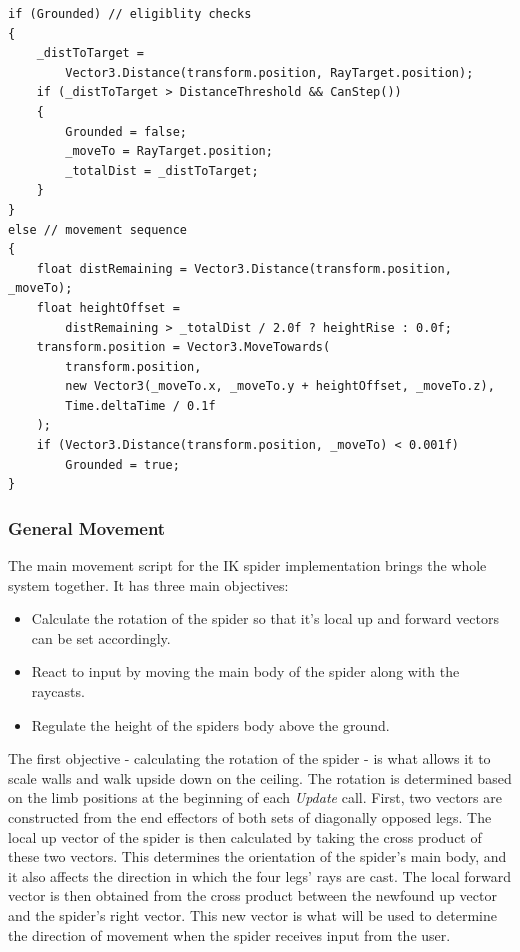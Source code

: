 \begin{lstlisting}[basicstyle=\footnotesize, numbers=none,frame=single,
caption={The script's \textit{Update} method which contains eligibility checks
and execution logic for the leg target's movement sequence.
\textit{TargetLogic.cs}},captionpos=b, label=target_move, language={[Sharp]c},
float=tp]
if (Grounded) // eligiblity checks
{
    _distToTarget = 
        Vector3.Distance(transform.position, RayTarget.position);
    if (_distToTarget > DistanceThreshold && CanStep())
    {
        Grounded = false;
        _moveTo = RayTarget.position;
        _totalDist = _distToTarget;
    }
}
else // movement sequence
{
    float distRemaining = Vector3.Distance(transform.position, _moveTo);
    float heightOffset =
        distRemaining > _totalDist / 2.0f ? heightRise : 0.0f;
    transform.position = Vector3.MoveTowards(
        transform.position,
        new Vector3(_moveTo.x, _moveTo.y + heightOffset, _moveTo.z),
        Time.deltaTime / 0.1f
    );
    if (Vector3.Distance(transform.position, _moveTo) < 0.001f)
        Grounded = true;
}
\end{lstlisting}

\subsubsection{General Movement}
The main movement script for the IK spider implementation brings the whole
system together. It has three main objectives:

\begin{itemize}

    \item Calculate the rotation of the spider so that it's local up and forward
        vectors can be set accordingly.

    \item React to input by moving the main body of the spider along with the
        raycasts.

    \item Regulate the height of the spiders body above the ground.

\end{itemize}

The first objective - calculating the rotation of the spider - is what allows it
to scale walls and walk upside down on the ceiling. The rotation is determined
based on the limb positions at the beginning of each \textit{Update} call.
First, two vectors are constructed from the end effectors of both sets of
diagonally opposed legs. The local up vector of the spider is then calculated by
taking the cross product of these two vectors. This determines the orientation
of the spider's main body, and it also affects the direction in which the four legs'
rays are cast. The local forward vector is then obtained from the cross product
between the newfound up vector and the spider's right vector. This new vector is
what will be used to determine the direction of movement when the spider
receives input from the user.


